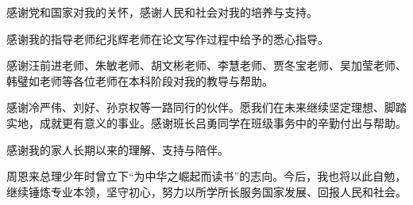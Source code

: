 感谢党和国家对我的关怀，感谢人民和社会对我的培养与支持。

感谢我的指导老师纪兆辉老师在论文写作过程中给予的悉心指导。

感谢汪前进老师、朱敏老师、胡文彬老师、李慧老师、贾冬宝老师、吴加莹老师、韩璧如老师等各位老师在本科阶段对我的教导与帮助。

感谢冷严伟、刘好、孙京权等一路同行的伙伴。愿我们在未来继续坚定理想、脚踏实地，成就更有意义的事业。感谢班长吕勇同学在班级事务中的辛勤付出与帮助。

感谢我的家人长期以来的理解、支持与陪伴。

周恩来总理少年时曾立下“为中华之崛起而读书”的志向。今后，我也将以此自勉，继续锤炼专业本领，坚守初心，努力以所学所长服务国家发展、回报人民和社会。